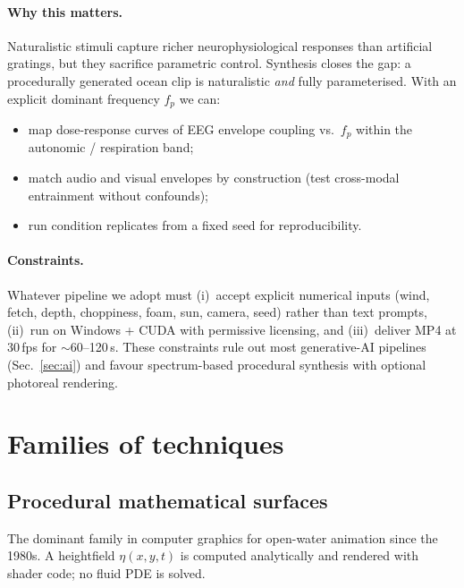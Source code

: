 \documentclass[11pt,a4paper]{article}
\begin{document}
\paragraph{Why this matters.} Naturalistic stimuli capture richer
neurophysiological responses than artificial gratings, but they sacrifice
parametric control. Synthesis closes the gap: a procedurally generated
ocean clip is naturalistic \emph{and} fully parameterised. With an
explicit dominant frequency $f_p$ we can:
\begin{itemize}[leftmargin=1.5em,itemsep=0.4em]
  \item map dose-response curves of EEG envelope coupling vs.\ $f_p$
        within the autonomic / respiration band;
  \item match audio and visual envelopes by construction (test
        cross-modal entrainment without confounds);
  \item run condition replicates from a fixed seed for reproducibility.
\end{itemize}

\paragraph{Constraints.} Whatever pipeline we adopt must (i)~accept
explicit numerical inputs (wind, fetch, depth, choppiness, foam, sun, camera, seed)
rather than text prompts, (ii)~run on Windows + CUDA with permissive
licensing, and (iii)~deliver MP4 at 30\,fps for $\sim$60--120\,s. These
constraints rule out most generative-AI pipelines (Sec.~\ref{sec:ai}) and
favour spectrum-based procedural synthesis with optional photoreal
rendering.

\section{Families of techniques}

\subsection{Procedural mathematical surfaces}

The dominant family in computer graphics for open-water animation since
the 1980s. A heightfield $\eta(x, y, t)$ is computed analytically and
rendered with shader code; no fluid PDE is solved.
\end{document}
